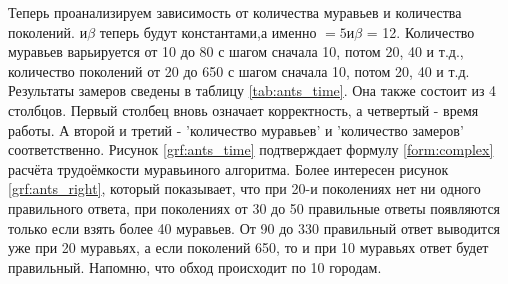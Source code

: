 \documentclass[a4paper, 14pt]{article}
\begin{document}
    Теперь проанализируем зависимость от количества муравьев и количества поколений. \alpha$ и \beta$ теперь будут константами,а именно \alpha$ = 5 и \beta$ = 12. Количество муравьев варьируется от 10 до 80 с шагом сначала 10, потом 20, 40 и т.д., количество поколений от 20 до 650 с шагом сначала 10, потом 20, 40 и т.д. Результаты замеров сведены в таблицу \ref{tab:ants_time}. Она также состоит из 4 столбцов. Первый столбец вновь означает корректность, а четвертый - время работы. А второй и третий - 'количество муравьев' и 'количество замеров' соответственно. Рисунок \ref{grf:ants_time} подтверждает формулу \ref{form:complex}  расчёта трудоёмкости муравьиного алгоритма. Более интересен рисунок \ref{grf:ants_right}, который показывает, что при 20-и поколениях нет ни одного правильного ответа, при поколениях от 30 до 50 правильные ответы появляются только если взять более 40 муравьев. От 90 до 330 правильный ответ выводится уже при 20 муравьях, а если поколений 650, то и при 10 муравьях ответ будет правильный. Напомню, что обход происходит по 10 городам.
    \newpage
\end{document}
